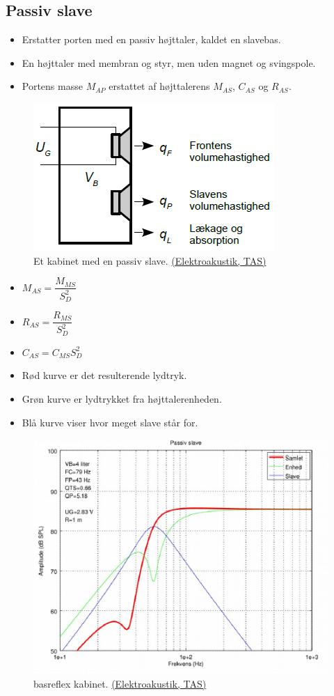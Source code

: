 \subsection{Passiv slave}
\begin{itemize}
	\item Erstatter porten med en passiv højttaler, kaldet en slavebas.
	\item En højttaler med membran og styr, men uden magnet og svingspole.
	\item Portens masse $M_{AP}$ erstattet af højttalerens $M_{AS}$, $C_{AS}$ og $R_{AS}$.
\end{itemize}

\begin{figure} [H]
	\centering
	\includegraphics[width=0.5\linewidth]{graphics/57.png}
	\caption{Et kabinet med en passiv slave. \href{http://www.torean.dk/artikel/Elektroakustik.pdf}{(Elektroakustik, TAS)}}
	\label{fig:57}
\end{figure}

\begin{itemize}
	\item $M_{AS}=\dfrac{M_{MS}}{S_D^2}$
	\item $R_{AS}=\dfrac{R_{MS}}{S_D^2}$
	\item $C_{AS}=C_{MS}S_D^2$
\end{itemize}

\begin{itemize}
	\item Rød kurve er det resulterende lydtryk.
	\item Grøn kurve er	lydtrykket fra højttalerenheden.
	\item Blå kurve viser hvor meget slave står for.
\end{itemize}

\begin{figure} [H]
	\centering
	\includegraphics[width=0.75\linewidth]{graphics/61.png}
	\caption{basreflex kabinet. \href{http://www.torean.dk/artikel/Elektroakustik.pdf}{(Elektroakustik, TAS)}}
	\label{fig:61}
\end{figure}

